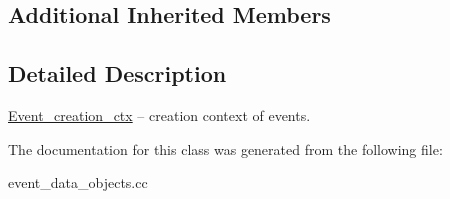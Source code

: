 \subsection*{Additional Inherited Members}


\subsection{Detailed Description}
\mbox{\hyperlink{classEvent__creation__ctx}{Event\+\_\+creation\+\_\+ctx}} -- creation context of events. 

The documentation for this class was generated from the following file\+:\begin{DoxyCompactItemize}
\item 
event\+\_\+data\+\_\+objects.\+cc\end{DoxyCompactItemize}
